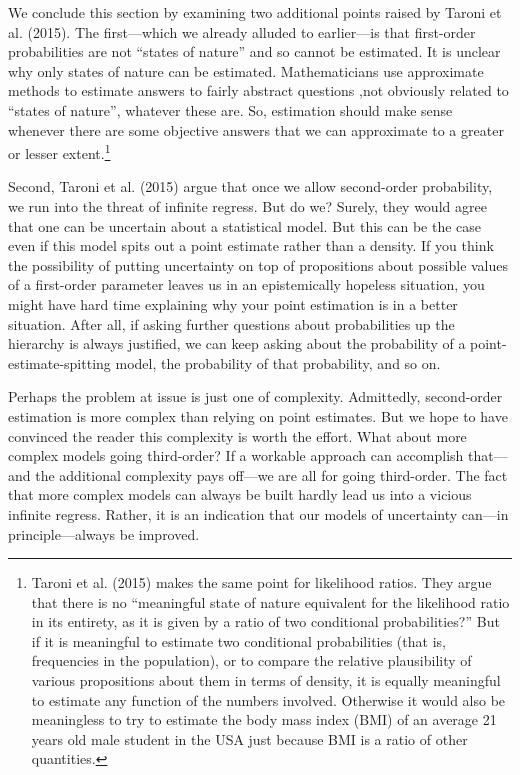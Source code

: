 \documentclass[
  10pt,
  dvipsnames,enabledeprecatedfontcommands]{scrartcl}
\begin{document}
We conclude this section by examining two additional points raised by
Taroni et al. (2015). The first---which we already alluded to
earlier---is that first-order probabilities are not ``states of nature''
and so cannot be estimated. It is unclear why only states of nature can
be estimated. Mathematicians use approximate methods to estimate answers
to fairly abstract questions ,not obviously related to ``states of
nature'', whatever these are. So, estimation should make sense whenever
there are some objective answers that we can approximate to a greater or
lesser extent.\footnote{Taroni et al. (2015) makes the same point for
  likelihood ratios. They argue that there is no ``meaningful state of
  nature equivalent for the likelihood ratio in its entirety, as it is
  given by a ratio of two conditional probabilities?'' But if it is
  meaningful to estimate two conditional probabilities (that is,
  frequencies in the population), or to compare the relative
  plausibility of various propositions about them in terms of density,
  it is equally meaningful to estimate any function of the numbers
  involved. Otherwise it would also be meaningless to try to estimate
  the body mass index (BMI) of an average 21 years old male student in
  the USA just because BMI is a ratio of other quantities.}

Second, Taroni et al. (2015) argue that once we allow second-order
probability, we run into the threat of infinite regress. But do we?
Surely, they would agree that one can be uncertain about a statistical
model. But this can be the case even if this model spits out a point
estimate rather than a density. If you think the possibility of putting
uncertainty on top of propositions about possible values of a
first-order parameter leaves us in an epistemically hopeless situation,
you might have hard time explaining why your point estimation is in a
better situation. After all, if asking further questions about
probabilities up the hierarchy is always justified, we can keep asking
about the probability of a point-estimate-spitting model, the
probability of that probability, and so on.

Perhaps the problem at issue is just one of complexity. Admittedly,
second-order estimation is more complex than relying on point estimates.
But we hope to have convinced the reader this complexity is worth the
effort. What about more complex models going third-order? If a workable
approach can accomplish that---and the additional complexity pays
off---we are all for going third-order. The fact that more complex
models can always be built hardly lead us into a vicious infinite
regress. Rather, it is an indication that our models of uncertainty
can---in principle---always be improved.
\end{document}
